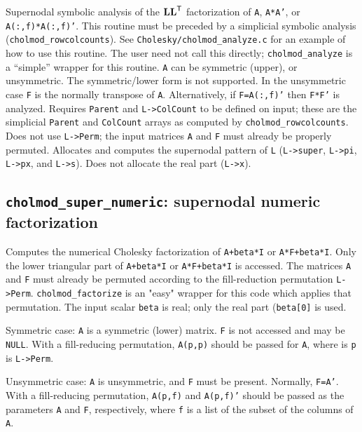 \documentclass[11pt]{article}
\newcommand{\m}[1]{{\bf{#1}}}       %
\newcommand{\tr}{^{\sf T}}          %
\begin{document}

Supernodal symbolic analysis of the $\m{LL}\tr$ factorization of {\tt A}, {\tt A*A'}, or {\tt A(:,f)*A(:,f)'}.
This routine must be preceded by a simplicial symbolic analysis
({\tt cholmod\_rowcolcounts}).  See {\tt Cholesky/cholmod\_analyze.c} for an example of how to use
this routine.
The user need not call this directly; {\tt cholmod\_analyze} is a ``simple'' wrapper for this routine.
{\tt A} can be symmetric (upper), or unsymmetric.  The symmetric/lower form is not supported.
In the unsymmetric case {\tt F} is the normally transpose of {\tt A}.
Alternatively, if {\tt F=A(:,f)'} then {\tt F*F'} is analyzed.
Requires {\tt Parent} and {\tt L->ColCount} to be defined on input; these are the
simplicial {\tt Parent} and {\tt ColCount} arrays as computed by {\tt cholmod\_rowcolcounts}.
Does not use {\tt L->Perm}; the input matrices {\tt A} and {\tt F} must already be properly
permuted.  Allocates and computes the supernodal pattern of {\tt L}
({\tt L->super}, {\tt L->pi}, {\tt L->px}, and {\tt L->s}).
Does not allocate the real part ({\tt L->x}).

\newpage \subsection{{\tt cholmod\_super\_numeric}: supernodal numeric factorization}


Computes the numerical Cholesky factorization of {\tt A+beta*I} or {\tt A*F+beta*I}.  Only the
lower triangular part of {\tt A+beta*I} or {\tt A*F+beta*I} is accessed.  The
matrices {\tt A} and {\tt F} must already be permuted according to the fill-reduction
permutation {\tt L->Perm}.  {\tt cholmod\_factorize} is an "easy" wrapper for this code
which applies that permutation.
The input scalar {\tt beta} is real; only the real part ({\tt beta[0]} is used.

Symmetric case: {\tt A} is a symmetric (lower) matrix.  {\tt F} is not accessed and may be {\tt NULL}.
With a fill-reducing permutation, {\tt A(p,p)} should be passed for {\tt A}, where is
{\tt p} is {\tt L->Perm}.

Unsymmetric case: {\tt A} is unsymmetric, and {\tt F} must be present.  Normally, {\tt F=A'}.
With a fill-reducing permutation, {\tt A(p,f)} and {\tt A(p,f)'} should be passed as the
parameters {\tt A} and {\tt F}, respectively, where {\tt f} is a list of the subset of the columns of {\tt A}.
\end{document}
